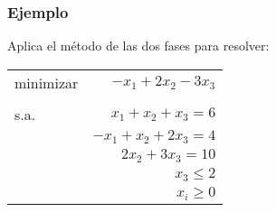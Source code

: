 \documentclass{beamer}
\begin{document}
\begin{frame}
\frametitle{Ejemplo}

Aplica el método de las dos fases para resolver:

\begin{center}
\begin{tabular}{lr}
minimizar & $-x_1 + 2x_2 -3x_3$ \\
	 &  \\
s.a. & $x_1+x_2+x_3 =6 $    \\
	 & $-x_1 + x_2 + 2x_3  = 4$  \\
	 & $2x_2 + 3x_3  = 10$  \\
	 & $x_3  \leq 2$  \\
	 & $x_i\geq 0$
\end{tabular}
\end{center}


\end{frame}
\end{document}
